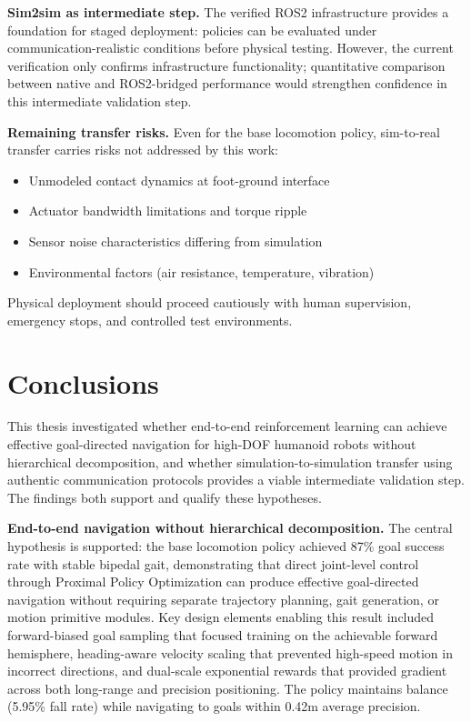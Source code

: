 \documentclass[12pt,a4paper]{article}
\begin{document}
\textbf{Sim2sim as intermediate step.} The verified ROS2 infrastructure provides a foundation for staged deployment: policies can be evaluated under communication-realistic conditions before physical testing. However, the current verification only confirms infrastructure functionality; quantitative comparison between native and ROS2-bridged performance would strengthen confidence in this intermediate validation step.

\textbf{Remaining transfer risks.} Even for the base locomotion policy, sim-to-real transfer carries risks not addressed by this work:
\begin{itemize}
    \item Unmodeled contact dynamics at foot-ground interface
    \item Actuator bandwidth limitations and torque ripple
    \item Sensor noise characteristics differing from simulation
    \item Environmental factors (air resistance, temperature, vibration)
\end{itemize}
Physical deployment should proceed cautiously with human supervision, emergency stops, and controlled test environments.

\newpage
\section{Conclusions}

This thesis investigated whether end-to-end reinforcement learning can achieve effective goal-directed navigation for high-DOF humanoid robots without hierarchical decomposition, and whether simulation-to-simulation transfer using authentic communication protocols provides a viable intermediate validation step. The findings both support and qualify these hypotheses.

\textbf{End-to-end navigation without hierarchical decomposition.} The central hypothesis is supported: the base locomotion policy achieved 87\% goal success rate with stable bipedal gait, demonstrating that direct joint-level control through Proximal Policy Optimization can produce effective goal-directed navigation without requiring separate trajectory planning, gait generation, or motion primitive modules. Key design elements enabling this result included forward-biased goal sampling that focused training on the achievable forward hemisphere, heading-aware velocity scaling that prevented high-speed motion in incorrect directions, and dual-scale exponential rewards that provided gradient across both long-range and precision positioning. The policy maintains balance (5.95\% fall rate) while navigating to goals within 0.42m average precision.
\end{document}
